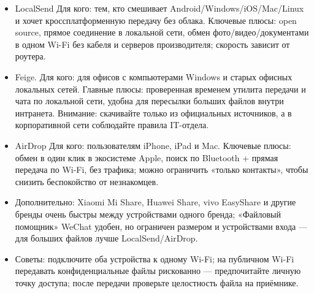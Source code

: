
\begin{itemize}
  \item LocalSend Для кого: тем, кто смешивает Android/Windows/iOS/Mac/Linux и хочет кроссплатформенную передачу без облака. Ключевые плюсы: open source, прямое соединение в локальной сети, обмен фото/видео/документами в одном Wi-Fi без кабеля и серверов производителя; скорость зависит от роутера.
  \item Feige. Для кого: для офисов с компьютерами Windows и старых офисных локальных сетей. Главные плюсы: проверенная временем утилита передачи и чата по локальной сети, удобна для пересылки больших файлов внутри интранета. Внимание: скачивайте только из официальных источников, а в корпоративной сети соблюдайте правила IT-отдела.
  \item AirDrop Для кого: пользователям iPhone, iPad и Mac. Ключевые плюсы: обмен в один клик в экосистеме Apple, поиск по Bluetooth + прямая передача по Wi-Fi, без трафика; можно ограничить «только контакты», чтобы снизить беспокойство от незнакомцев.
  \item Дополнительно: Xiaomi Mi Share, Huawei Share, vivo EasyShare и другие бренды очень быстры между устройствами одного бренда; «Файловый помощник» WeChat удобен, но ограничен размером и устройствами входа — для больших файлов лучше LocalSend/AirDrop.
  \item Советы: подключите оба устройства к одному Wi-Fi; на публичном Wi-Fi передавать конфиденциальные файлы рискованно — предпочитайте личную точку доступа; после передачи проверьте целостность файла на приёмнике.
\end{itemize}


